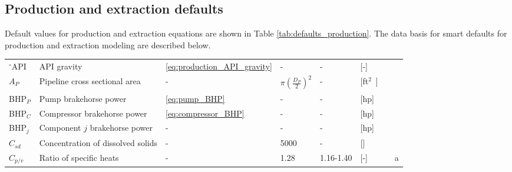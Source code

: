 \documentclass[11pt]{report}
\begin{document}
{\subsection{Production and extraction defaults}

Default values for production and extraction equations are shown in Table \ref{tab:defaults_production}. The data basis for smart defaults for production and extraction modeling are described below.








\begin{landscape}
\begin{scriptsize}
\tablelasttail{\bottomrule}
\label{tab:defaults_production}
\begin{supertabular*}{1\columnwidth}{p{0.05\columnwidth}p{0.25\columnwidth}p{0.05\columnwidth}p{0.1\columnwidth}p{0.1\columnwidth}p{0.15\columnwidth}p{0.085\columnwidth}p{0.045\columnwidth}}
$^{\circ}${API} & API gravity & \eqref{eq:production_API_gravity} & - & - & [-] & \cite[p. 47]{Manning1995} & \\
$A_{P}$ & Pipeline cross sectional area & - & $\pi\left(\frac{D_{P}}{2}\right)^2$ & - & [\unit{ft$^2$}] & & \\
BHP$_{P}$ & Pump brakehorse power & \eqref{eq:pump_BHP} & - & - & [hp] & \cite[p. 27]{Rose1989} & \\
BHP$_{C}$ & Compressor brakehorse power & \eqref{eq:compressor_BHP} & - & - & [hp] & & \\
BHP$_{j}$ & Component $j$ brakehorse power & - & - & - & [hp] & & \\
$C_{sd}$ & Concentration of dissolved solids & - & 5000 & - & [] &\cite{Vlasopoulos2006} & \\
$C_{p/v}$ & Ratio of specific heats & - & 1.28 & 1.16-1.40 & [-] & \cite[p. 320]{Mcallister2009} & a \\

\end{supertabular*}
\end{scriptsize}
\end{landscape}}
\end{document}
